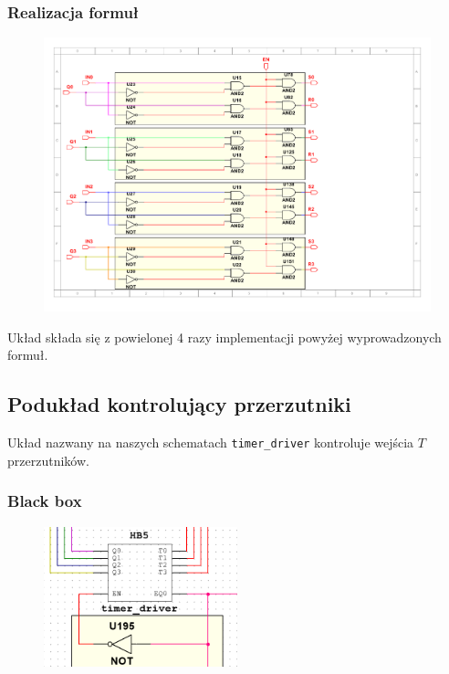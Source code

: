 \documentclass[a4paper]{article}
\begin{document}
\subsubsection{Realizacja formuł}
\begin{figure}[H]
    \centering
    \includegraphics[width=\textwidth]{timer_setter_subsheet.pdf}
\end{figure}
Układ składa się z powielonej 4 razy implementacji powyżej wyprowadzonych formuł.


\subsection{Podukład kontrolujący przerzutniki}
Układ nazwany na naszych schematach \verb|timer_driver| kontroluje wejścia $T$ przerzutników.
\subsubsection{Black box}
\begin{figure}[H]
    \centering
    \includegraphics[width=0.5\textwidth]{timer_driver_black_box.png}
\end{figure}
\end{document}
